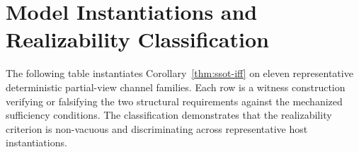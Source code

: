 \section{Model Instantiations and Realizability Classification}\label{sec:appendix-classification}

The following table instantiates Corollary~\ref{thm:ssot-iff} on eleven representative deterministic partial-view channel families. Each row is a witness construction verifying or falsifying the two structural requirements against the mechanized sufficiency conditions. The classification demonstrates that the realizability criterion is non-vacuous and discriminating across representative host instantiations.

\begingroup
\footnotesize
\setlength{\tabcolsep}{2.5pt}
\renewcommand{\arraystretch}{1.08}
\setlength{\LTleft}{0pt}
\setlength{\LTright}{0pt}
